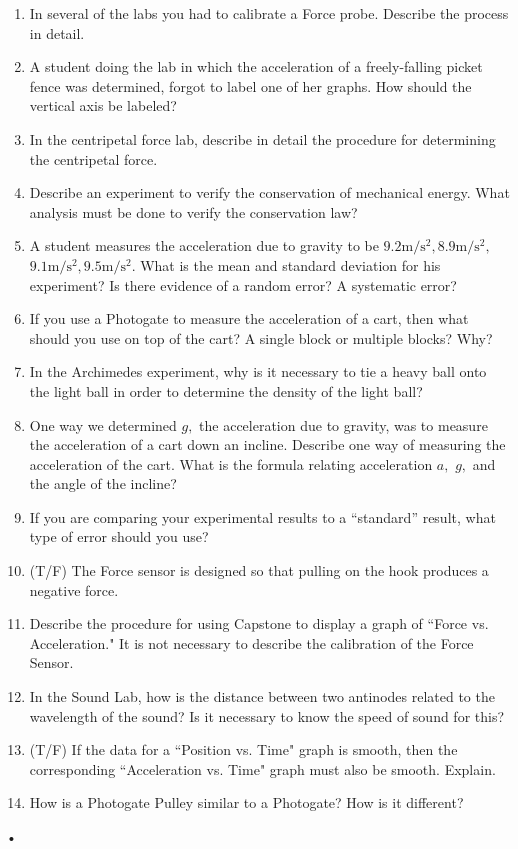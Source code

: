 \documentclass[main.tex]{subfiles}
\begin{document}
\begin{enumerate}
\item
In several of the labs you had to calibrate a Force probe. Describe the process in detail.
\item
A student doing the lab in which the acceleration of a freely-falling picket fence was determined, forgot to label one of her graphs. How should the vertical axis be labeled?
\item
In the centripetal force lab, describe in detail the procedure for determining the centripetal force.
\item
Describe an experiment to verify the conservation of mechanical energy. What analysis must be done to verify the conservation law?
\item
A student measures the acceleration due to gravity to be $9.2 \text{m}/\text{s}^2, 8.9 \text{m}/\text{s}^2,$ $9.1 \text{m}/\text{s}^2, 9.5 \text{m}/\text{s}^2.$ What is the mean and standard deviation for his experiment? Is there evidence of a random error? A systematic error?
\item
If you use a Photogate to measure the acceleration of a cart, then what should you use on top of the cart? A single block or multiple blocks? Why?
\item
In the Archimedes experiment, why is it necessary to tie a heavy ball onto the light ball in order to determine the density of the light ball?
\item
One way we determined $g,$ the acceleration due to gravity, was to measure the acceleration of a cart down an incline. Describe one way of measuring the
acceleration of the cart. What is the formula relating acceleration $a,$ $g,$ and the angle of the incline?
\item
If you are comparing your experimental results to a ``standard'' result, what type of error should you use?
\item
(T/F) The Force sensor is designed so that pulling on the hook produces a negative force.
\item
Describe the procedure for using Capstone to display a graph of ``Force vs. Acceleration." It is not necessary to describe the calibration of the Force Sensor.
\item
In the Sound Lab, how is the distance between two antinodes related to the wavelength of the sound? Is it necessary to know the speed of sound for this?
\item
(T/F) If the data for a ``Position vs. Time" graph is smooth, then the corresponding ``Acceleration vs. Time" graph must also be smooth. Explain.
\item
How is a Photogate Pulley similar to a Photogate? How is it different?
\end{enumerate}•
\end{document}
